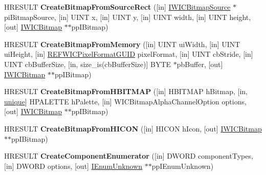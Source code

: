 \begin{DoxyCompactItemize}
\item 
\mbox{\label{interface_i_w_i_c_imaging_factory_aee82645cf6fc2d78af04eec6b5aa0a42}} 
H\+R\+E\+S\+U\+LT {\bfseries Create\+Bitmap\+From\+Source\+Rect} (\mbox{[}in\mbox{]} \hyperlink{interface_i_w_i_c_bitmap_source}{I\+W\+I\+C\+Bitmap\+Source} $\ast$pi\+Bitmap\+Source, \mbox{[}in\mbox{]} U\+I\+NT x, \mbox{[}in\mbox{]} U\+I\+NT y, \mbox{[}in\mbox{]} U\+I\+NT width, \mbox{[}in\mbox{]} U\+I\+NT height, \mbox{[}out\mbox{]} \hyperlink{interface_i_w_i_c_bitmap}{I\+W\+I\+C\+Bitmap} $\ast$$\ast$pp\+I\+Bitmap)
\item 
\mbox{\label{interface_i_w_i_c_imaging_factory_a5a40830b5c3f1af6b3a93290df43ad83}} 
H\+R\+E\+S\+U\+LT {\bfseries Create\+Bitmap\+From\+Memory} (\mbox{[}in\mbox{]} U\+I\+NT ui\+Width, \mbox{[}in\mbox{]} U\+I\+NT ui\+Height, \mbox{[}in\mbox{]} \hyperlink{struct___g_u_i_d}{R\+E\+F\+W\+I\+C\+Pixel\+Format\+G\+U\+ID} pixel\+Format, \mbox{[}in\mbox{]} U\+I\+NT cb\+Stride, \mbox{[}in\mbox{]} U\+I\+NT cb\+Buffer\+Size, \mbox{[}in, size\+\_\+is(cb\+Buffer\+Size)\mbox{]} B\+Y\+TE $\ast$pb\+Buffer, \mbox{[}out\mbox{]} \hyperlink{interface_i_w_i_c_bitmap}{I\+W\+I\+C\+Bitmap} $\ast$$\ast$pp\+I\+Bitmap)
\item 
\mbox{\label{interface_i_w_i_c_imaging_factory_a4f059b140241b9b020e21d17243685e4}} 
H\+R\+E\+S\+U\+LT {\bfseries Create\+Bitmap\+From\+H\+B\+I\+T\+M\+AP} (\mbox{[}in\mbox{]} H\+B\+I\+T\+M\+AP h\+Bitmap, \mbox{[}in, \hyperlink{interfaceunique}{unique}\mbox{]} H\+P\+A\+L\+E\+T\+TE h\+Palette, \mbox{[}in\mbox{]} W\+I\+C\+Bitmap\+Alpha\+Channel\+Option options, \mbox{[}out\mbox{]} \hyperlink{interface_i_w_i_c_bitmap}{I\+W\+I\+C\+Bitmap} $\ast$$\ast$pp\+I\+Bitmap)
\item 
\mbox{\label{interface_i_w_i_c_imaging_factory_ae040f3733313fc4e314d2109c8115b28}} 
H\+R\+E\+S\+U\+LT {\bfseries Create\+Bitmap\+From\+H\+I\+C\+ON} (\mbox{[}in\mbox{]} H\+I\+C\+ON h\+Icon, \mbox{[}out\mbox{]} \hyperlink{interface_i_w_i_c_bitmap}{I\+W\+I\+C\+Bitmap} $\ast$$\ast$pp\+I\+Bitmap)
\item 
\mbox{\label{interface_i_w_i_c_imaging_factory_a457beb1cb3bc5715d2920e9657bd6701}} 
H\+R\+E\+S\+U\+LT {\bfseries Create\+Component\+Enumerator} (\mbox{[}in\mbox{]} D\+W\+O\+RD component\+Types, \mbox{[}in\mbox{]} D\+W\+O\+RD options, \mbox{[}out\mbox{]} \hyperlink{interface_i_enum_unknown}{I\+Enum\+Unknown} $\ast$$\ast$pp\+I\+Enum\+Unknown)
$$
\end{DoxyCompactItemize}
